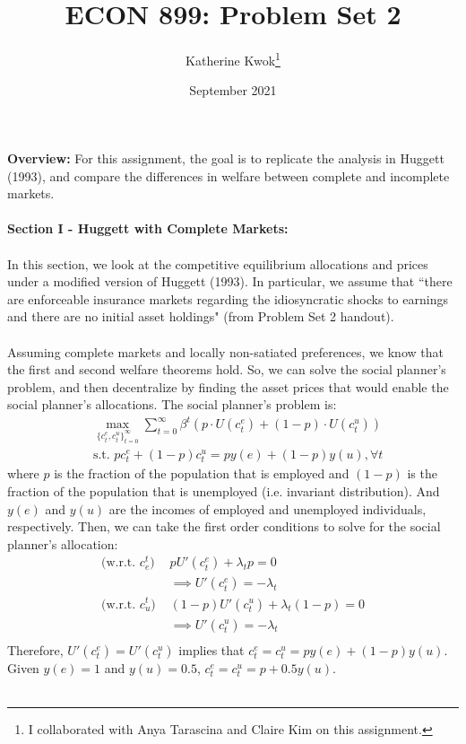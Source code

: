 \documentclass[12pt]{article}
\title{ECON 899: Problem Set 2}
\author{Katherine Kwok\footnote{I collaborated with Anya Tarascina and Claire Kim on this assignment.}}
\date{September 2021}
\begin{document}
\maketitle
\noindent \textbf{Overview: } For this assignment, the goal is to replicate the analysis in Huggett (1993), and compare the differences in welfare between complete and incomplete markets.\\\\
\noindent \textbf{Section I - Huggett with Complete Markets: } \\\\
In this section, we look at the competitive equilibrium allocations and prices under a modified version of Huggett (1993). In particular, we assume that ``there are enforceable insurance markets regarding the idiosyncratic shocks to earnings and there are no initial asset holdings" (from Problem Set 2 handout).\\\\
Assuming complete markets and locally non-satiated preferences, we know that the first and second welfare theorems hold. So, we can solve the social planner's problem, and then decentralize by finding the asset prices that would enable the social planner's allocations. The social planner's problem is: 
\begin{align*}
    &\max_{\{c_t^e, c_t^u\}_{t=0}^{\infty}} \sum_{t=0}^{\infty} \beta^t (p \cdot U(c^e_t) + (1-p) \cdot U(c_t^u)) \\
    &\text{s.t. } pc_t^e + (1-p)c_t^u = py(e) + (1-p) y(u), \forall t
\end{align*}
where $p$ is the fraction of the population that is employed and $(1-p)$ is the fraction of the population that is unemployed (i.e. invariant distribution). And $y(e)$ and $y(u)$ are the incomes of employed and unemployed individuals, respectively. Then, we can take the first order conditions to solve for the social planner's allocation: 
\begin{align*}
    \text{(w.r.t. $c_e^t$) } & p U'(c_t^e) + \lambda_t p = 0\\
    &\implies U'(c_t^e) = -\lambda_t \\
    \text{(w.r.t. $c_u^t$) } & (1-p) U'(c_t^u) + \lambda_t (1-p) = 0 \\
    &\implies U'(c_t^u) = -\lambda_t \\
\end{align*}
Therefore, $U'(c_t^e) = U'(c_t^u)$ implies that $c_t^e = c_t^u = py(e) + (1-p)y(u)$. Given $y(e) = 1$ and $y(u) = 0.5$, $c_t^e = c_t^u = p + 0.5y(u)$. \\\\
\end{document}
